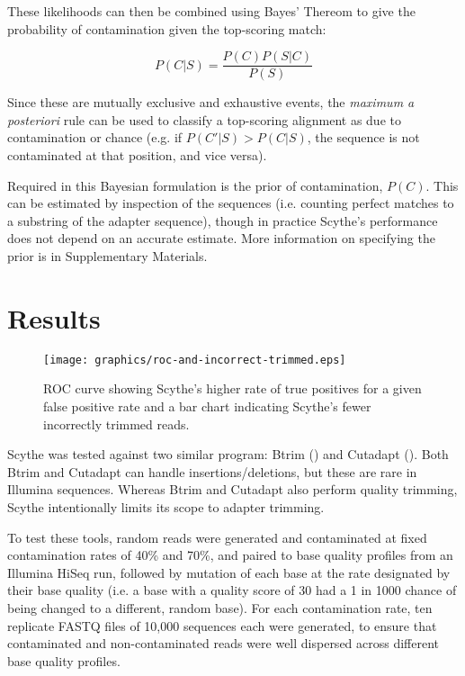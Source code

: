\documentclass{bioinfo}
\begin{document}
\begin{methods}
These likelihoods can then be combined using Bayes' Thereom to give
the probability of contamination given the top-scoring match:

$$ P(C|S) = \frac{P(C) P(S|C)}{P(S)} $$

Since these are mutually exclusive and exhaustive events, the
\emph{maximum a posteriori} rule can be used to classify a top-scoring
alignment as due to contamination or chance (e.g. if $P(C'|S) >
P(C|S)$, the sequence is not contaminated at that position, and
vice versa).

Required in this Bayesian formulation is the prior of contamination,
$P(C)$. This can be estimated by inspection of the sequences
(i.e. counting perfect matches to a substring of the adapter
sequence), though in practice Scythe's performance does not depend on
an accurate estimate. More information on specifying the prior is in
Supplementary Materials.

\section{Results}
\begin{centering}
\begin{figure*}[!tpb]
\texttt{[image: graphics/roc-and-incorrect-trimmed.eps]}
\caption{ROC curve showing Scythe's higher rate of true positives for
  a given false positive rate and a bar chart indicating Scythe's
  fewer incorrectly trimmed reads.}\label{fig:02}
\end{figure*}
\end{centering}

Scythe was tested against two similar program: Btrim
(\citealp{pmid21651976}) and Cutadapt (\citealp{EJ200}). Both Btrim
and Cutadapt can handle insertions/deletions, but these are rare in
Illumina sequences. Whereas Btrim and Cutadapt also perform quality
trimming, Scythe intentionally limits its scope to adapter trimming.

To test these tools, random reads were generated and contaminated at
fixed contamination rates of 40\% and 70\%, and paired to base quality
profiles from an Illumina HiSeq run, followed by mutation of each base
at the rate designated by their base quality (i.e. a base with a
quality score of 30 had a 1 in 1000 chance of being changed to a
different, random base). For each contamination rate, ten replicate
FASTQ files of 10,000 sequences each were generated, to ensure that
contaminated and non-contaminated reads were well dispersed across
different base quality profiles.


\end{methods}
\end{document}
